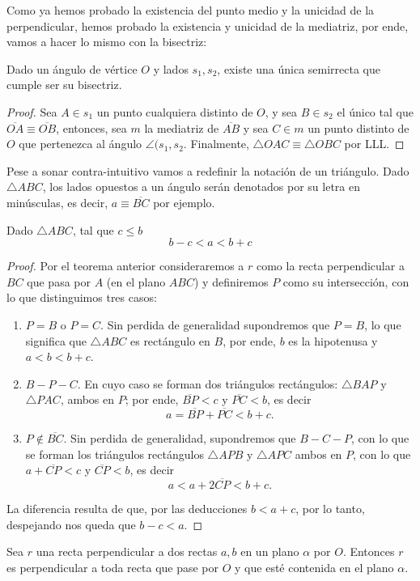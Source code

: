 \documentclass[11pt,a4paper]{book}
\begin{document}
Como ya hemos probado la existencia del punto medio y la unicidad de la perpendicular, hemos probado la existencia y unicidad de la mediatriz, por ende, vamos a hacer lo mismo con la bisectriz:
\begin{thm}
	Dado un ángulo de vértice $O$ y lados $s_1,s_2$, existe una única semirrecta que cumple ser su bisectriz.
\end{thm}
\begin{proof}
	Sea $A\in s_1$ un punto cualquiera distinto de $O$, y sea $B\in s_2$ el único tal que $\overline{OA}\equiv\overline{OB}$, entonces, sea $m$ la mediatriz de $\overline{AB}$ y sea $C\in m$ un punto distinto de $O$ que pertenezca al ángulo $\angle(s_1,s_2$. Finalmente, $\triangle OAC\equiv\triangle OBC$ por LLL.
\end{proof}
Pese a sonar contra-intuitivo vamos a redefinir la notación de un triángulo. Dado $\triangle ABC$, los lados opuestos a un ángulo serán denotados por su letra en minúsculas, es decir, $a\equiv\overline{BC}$ por ejemplo.
\begin{thm}
Dado $\triangle ABC$, tal que $c\leq b$
$$b-c\lt a\lt b+c$$
\end{thm}
\begin{proof}
Por el teorema anterior consideraremos a $r$ como la recta perpendicular a $BC$ que pasa por $A$ (en el plano $ABC$) y definiremos $P$ como su intersección, con lo que distinguimos tres casos:
\begin{enumerate}
\item $P=B$ o $P=C$. Sin perdida de generalidad supondremos que $P=B$, lo que significa que $\triangle ABC$ es rectángulo en $B$, por ende, $b$ es la hipotenusa y $a\lt b\lt b+c$.
\item $B-P-C$. En cuyo caso se forman dos triángulos rectángulos: $\triangle BAP$ y $\triangle PAC$, ambos en $P$; por ende, $\overline{BP}\lt c$ y $\overline{PC}\lt b$, es decir
$$a=\overline{BP}+\overline{PC}\lt b+c.$$
\item $P\notin\overline{BC}$. Sin perdida de generalidad, supondremos que $B-C-P$, con lo que se forman los triángulos rectángulos $\triangle APB$ y $\triangle APC$ ambos en $P$, con lo que $a+\overline{CP}\lt c$ y $\overline{CP}\lt b$, es decir
$$a\lt a+2\overline{CP}\lt b+c.$$
\end{enumerate}
La diferencia resulta de que, por las deducciones $b\lt a+c$, por lo tanto, despejando nos queda que $b-c\lt a$.
\end{proof}
\begin{lem}
Sea $r$ una recta perpendicular a dos rectas $a,b$ en un plano $\alpha$ por $O$. Entonces $r$ es perpendicular a toda recta que pase por $O$ y que esté contenida en el plano $\alpha$. 
\end{lem}
\end{document}
